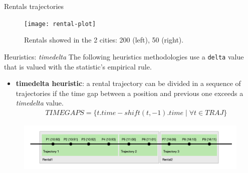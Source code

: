 \documentclass{beamer}
\begin{document}
\begin{frame}{Rentals trajectories}
\begin{figure}[bt]
	\centering
	\texttt{[image: rental-plot]}
	\label{fig:rental-plot}
	\caption{Rentals showed in the 2 cities: 200 (left), 50 (right).}
\end{figure}
\end{frame}

\begin{frame}{Heuristics: \textit{timedelta}}
The following heuristics methodologies use a \texttt{delta} value that is valued with the statistic's empirical rule.
\begin{itemize}
	\item \textbf{timedelta heuristic}: a rental trajectory can be divided in a sequence of trajectories if the time gap between a position and previous one exceeds a \textit{timedelta} value.
	\begin{align}
	TIMEGAPS = \{t.time - shift(t, -1).time \mid \forall t \in TRAJ \}
	\end{align}
\end{itemize}

\begin{figure}[bt]
	\centering
	\includegraphics[width=\textwidth]{trajectory-timedelta}
	\label{fig:trajectory-timedelta}
\end{figure}
\end{frame}
\end{document}
